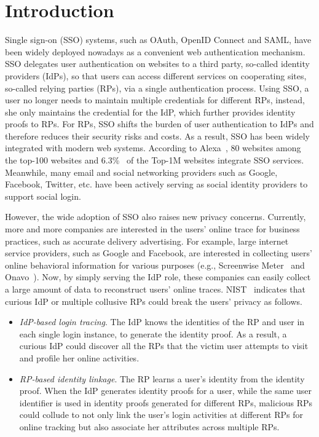 \section{Introduction}
\label{sec:intro}
Single sign-on (SSO) systems, such as OAuth, OpenID Connect and SAML, have been widely deployed nowadays as a convenient web authentication mechanism. SSO delegates user authentication on websites to a third party, so-called identity providers (IdPs), so that users can access different services on cooperating sites, so-called relying parties (RPs), via a single authentication process. Using SSO, a user no longer needs to maintain multiple credentials for different RPs, instead, she only maintains the credential for the IdP, which further provides identity proofs to RPs.
For RPs, SSO shifts the burden of user authentication to IdPs and therefore reduces their security risks and costs. As a result, SSO has been widely integrated with modern web systems.
According to Alexa~\cite{Alexa}, 80 websites among the top-100 websites and 6.3\%~\cite{GhasemisharifRC18} of the Top-1M websites integrate SSO services.
Meanwhile, many email and social networking providers such as Google, Facebook, Twitter, etc. have been actively serving as social identity providers to support social login.

However, the wide adoption of SSO also raises new privacy concerns. 
Currently, more and more companies are interested in the users' online trace for business practices, such as accurate delivery advertising. For example, large internet service providers, such as Google and Facebook, are interested in collecting users' online behavioral information for various purposes (e.g., Screenwise Meter~\cite{googlenews} and Onavo~\cite{Onavo}). Now, by simply serving the IdP role, these companies can easily collect a large amount of data to reconstruct users' online traces. 
NIST~\cite{NIST2017draft} indicates that curious IdP or multiple collusive RPs could break the users' privacy as follows.
\begin{itemize}
\item {\em IdP-based login tracing}. The IdP knows the identities of the RP and user in each single login instance, to generate the identity proof.
As a result, a curious IdP could discover all the RPs that the victim user attempts to visit and profile her online activities.
\item {\em RP-based identity linkage}. The RP learns a user's identity from the identity proof.
When the IdP generates identity proofs for a user, while the same user identifier is used in identity proofs generated for different RPs, malicious RPs could collude to not only link the user's login activities at different RPs for online tracking but also associate her attributes across multiple RPs.
\end{itemize}

